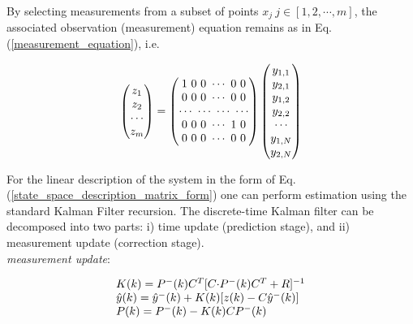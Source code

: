\documentclass[journal]{IEEEtran}
\begin{document}
\noindent By selecting measurements from a subset of points $x_j \ j{\in}[1,2,\cdots,m]$, the associated observation (measurement) equation remains as in Eq. (\ref{measurement_equation}), i.e.

\begin{equation} \label{measurement_equation_2}
\begin{tabular}{c}
$\begin{pmatrix}
z_1 \\
z_2 \\
\cdots \\
z_m
\end{pmatrix}=
\begin{pmatrix}
1 \ 0 \ 0 \ \cdots \ 0 \ 0 \\
0 \ 0 \ 0 \ \cdots \ 0 \ 0 \\
\cdots \ \cdots \ \cdots \ \cdots  \\
0 \ 0 \ 0 \ \cdots \ 1 \ 0 \\
0 \ 0 \ 0 \ \cdots \ 0 \ 0
\end{pmatrix}
\begin{pmatrix}
y_{1,1} \\
y_{2,1} \\
y_{1,2} \\
y_{2,2} \\
\cdots \\
y_{1,N} \\
y_{2,N}
\end{pmatrix}$
\end{tabular}
\end{equation}


\noindent For the linear description of the system in the form of Eq. (\ref{state_space_description_matrix_form}) one can perform estimation using the standard Kalman Filter recursion. The discrete-time Kalman filter can be decomposed into two parts: i) time update (prediction stage), and ii) measurement update (correction stage).\\

\noindent \textit{measurement update}:

\begin{equation} \label{KF_meas_update}
\begin{tabular}{l}
$K(k)={P^{-}(k)}{C^T}[C{\cdot}P^{-}(k){C^T}+R]^{-1}$ \\
${\hat{y}(k)}={\hat{y}^{-}(k)}+K(k)[z(k)-C{\hat{y}^{-}(k)}]$ \\
$P(k)=P^{-}(k)-K(k)CP^{-}(k)$
\end{tabular}
\end{equation}
\end{document}
